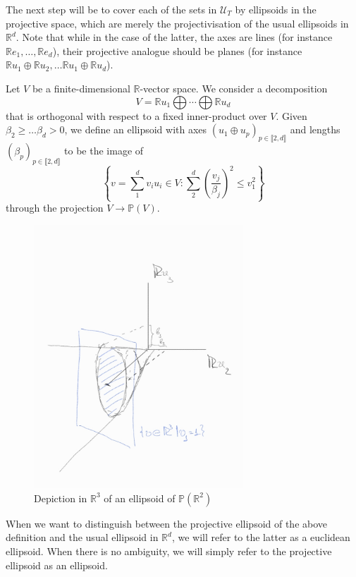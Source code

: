 \documentclass{report}
\begin{document}
The next step will be to cover each of the sets in $\mathcal U_T$ by ellipsoids in the projective space, which are merely the projectivisation of the usual ellipsoids in $\mathbb R^d$.
Note that while in the case of the latter, the axes are lines (for instance $\mathbb Re_1, \ldots, \mathbb Re_d$), their projective analogue should be planes (for instance $\mathbb R u_1 \oplus \mathbb R u_2, \ldots \mathbb R u_1 \oplus \mathbb R u_d$).
\begin{definition}
    Let $V$ be a finite-dimensional $\mathbb R$-vector space.
    We consider a decomposition
    \[
        V = \mathbb R u_1 \bigoplus \cdots \bigoplus \mathbb R u_d
    \] 
    that is orthogonal with respect to a fixed inner-product over $V$.
    Given $\beta_2 \geq \ldots \beta_d > 0$, we define an ellipsoid with axes $\left(u_1 \oplus u_p\right)_{p \in \llbracket 2, d \rrbracket}$ and lengths $(\beta_p)_{p \in \llbracket 2, d \rrbracket}$ to be the image of
    \[
        \left\{
            v = \sum_1^d v_i u_i\in V : \sum_2^d \left( \frac{v_j}{\beta_j} \right)^2 \leq v_1^2
        \right\}
    \]
    through the projection $ V \to \mathbb P (V)$.
\end{definition}
\begin{figure}[h]
    \centering
    \includegraphics[width=0.7\textwidth]{ellipsoid.jpg}
    \caption{Depiction in $\mathbb R^3$ of an ellipsoid of $\mathbb P(\mathbb R^2)$}
    \label{fig:ellipsoid}
\end{figure}
When we want to distinguish between the projective ellipsoid of the above definition and the usual ellipsoid in $\mathbb R^d$, we will refer to the latter as a euclidean ellipsoid.
When there is no ambiguity, we will simply refer to the projective ellipsoid as an ellipsoid.
\end{document}
